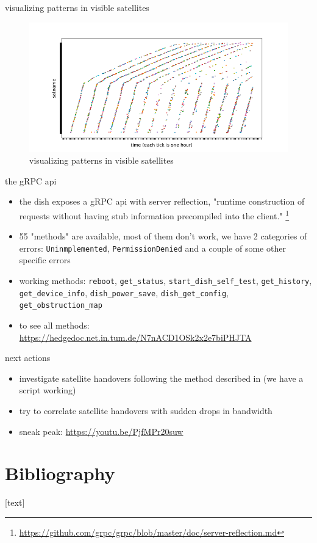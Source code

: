 \documentclass[NET,english,beameralt]{tumbeamer}
\begin{document}
\begin{frame}{visualizing patterns in visible satellites}
\begin{figure}
    \includegraphics[width=1\textwidth]{pics/visualizing-how-long-satellites-are-visible-for.png}
    \caption[short]{visualizing patterns in visible satellites}
\end{figure}
\end{frame}

\begin{frame}{the gRPC api}
\begin{itemize}
    \item the dish exposes a gRPC api with server reflection, "runtime construction of requests without having stub information precompiled into the client." \footnote{\href{https://github.com/grpc/grpc/blob/master/doc/server-reflection.md}{https://github.com/grpc/grpc/blob/master/doc/server-reflection.md}}
    \item 55 "methods" are available, most of them don't work, we have 2 categories of errors: \texttt{Uninmplemented}, \texttt{PermissionDenied} and a couple of some other specific errors 
    \item working methods: \texttt{reboot}, \texttt{get\_status}, \texttt{start\_dish\_self\_test}, \texttt{get\_history}, \texttt{get\_device\_info}, \texttt{dish\_power\_save}, \texttt{dish\_get\_config}, \texttt{get\_obstruction\_map}
    \item to see all methods: \href{https://hedgedoc.net.in.tum.de/N7nACD1OSk2x2e7biPHJTA}{https://hedgedoc.net.in.tum.de/N7nACD1OSk2x2e7biPHJTA}
\end{itemize}
\end{frame}

\begin{frame}{next actions}
\begin{itemize}
    \item investigate satellite handovers following the method described in \cite{izhikevich2023democratizing} (we have a script working)
    \item try to correlate satellite handovers with sudden drops in bandwidth
    \item sneak peak: \href{https://youtu.be/PjfMPr20suw}{https://youtu.be/PjfMPr20suw}
\end{itemize}
\end{frame}

\section{Bibliography}
\begin{frame}[allowframebreaks]
    
    [text]
    \footnotesize
    
\end{frame}
\end{document}
